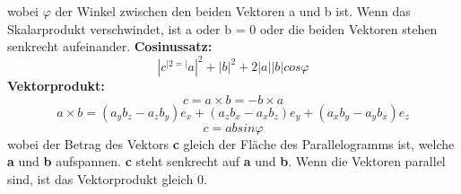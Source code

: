 \documentclass[7pt]{article}
\begin{document}
\begin{multicols}{3}
wobei  $\varphi$ der Winkel zwischen den beiden Vektoren a und b ist. Wenn das Skalarprodukt verschwindet, ist a oder b = 0 oder die beiden Vektoren stehen senkrecht aufeinander.
\newline
\newline \textbf{Cosinussatz:}
\begin{equation}
	|c^|{2} = |a|^{2} + |b|^{2} + 2|a||b|cos\varphi
\end{equation}
\textbf{Vektorprodukt:}
\begin{equation}
	c = a \times b = -b \times a
\end{equation}
\begin{equation}
	a \times b = (a_{y}b_{z} - a_{z}b_{y})e_{x} +  (a_{z}b_{x} - a_{x}b_{z})e_{y}	 +  (a_{x}b_{y} - a_{y}b_{x})e_{z}	
\end{equation}
\begin{equation}
	c = ab sin \varphi
\end{equation}
wobei der Betrag des Vektors \textbf{c} gleich der Fläche des Parallelogramms ist, welche \textbf{a} und \textbf{b} aufspannen. \textbf{c} steht senkrecht auf \textbf{a} und \textbf{b}. Wenn die Vektoren parallel sind, ist das Vektorprodukt gleich 0. 


\
	
\end{multicols}
\end{document}
